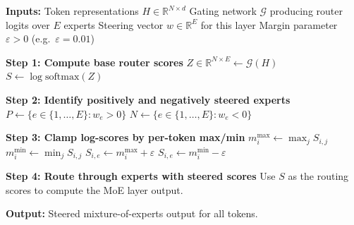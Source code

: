 \begin{algorithm}[h]
\caption{Inference-Time Expert Steering in an MoE Layer}
\begin{algorithmic}[1]

\STATE \textbf{Inputs:}
\STATE \hspace{0.5em} Token representations $H \in \mathbb{R}^{N \times d}$
\STATE \hspace{0.5em} Gating network $\mathcal{G}$ producing router logits over $E$ experts
\STATE \hspace{0.5em} Steering vector $w \in \mathbb{R}^{E}$ for this layer
\STATE \hspace{0.5em} Margin parameter $\varepsilon > 0$ (e.g.\ $\varepsilon = 0.01$)

\STATE \textbf{Step 1: Compute base router scores}
\STATE $Z \in \mathbb{R}^{N \times E} \gets \mathcal{G}(H)$ 
\STATE $S \gets \log \mathrm{softmax}(Z)$ 

\STATE \textbf{Step 2: Identify positively and negatively steered experts}
\STATE $P \gets \{ e \in \{1,\dots,E\} : w_e > 0 \}$ 
\STATE $N \gets \{ e \in \{1,\dots,E\} : w_e < 0 \}$ 

\STATE \textbf{Step 3: Clamp log-scores by per-token max/min}
  \STATE $m^{\max}_i \gets \max_{j} S_{i,j}$ 
  \STATE $m^{\min}_i \gets \min_{j} S_{i,j}$ 
    \STATE $S_{i,e} \gets m^{\max}_i + \varepsilon$
  \ENDFOR
    \STATE $S_{i,e} \gets m^{\min}_i - \varepsilon$
  \ENDFOR
\ENDFOR

\STATE \textbf{Step 4: Route through experts with steered scores}
\STATE Use $S$ as the routing scores to compute the MoE layer output.

\STATE \textbf{Output:} Steered mixture-of-experts output for all tokens.

\end{algorithmic}
\end{algorithm}
